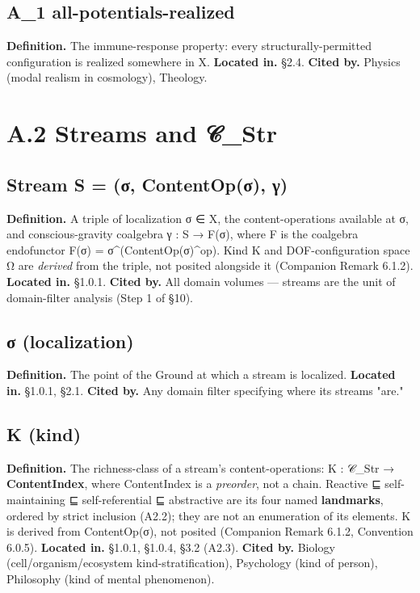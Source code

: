 \documentclass[11pt, openany]{book}
\newcommand{\sectionbreak}{\clearpage}
\begin{document}
\subsection{A\_\allowbreak{}1 all-potentials-realized}
\textbf{Definition.} The immune-response property: every structurally-permitted configuration is realized somewhere in X.
\textbf{Located in.} §2.4.
\textbf{Cited by.} Physics (modal realism in cosmology), Theology.

\sectionbreak

\section{A.2 Streams and 𝒞\_\allowbreak{}Str}

\subsection{Stream S = (σ, ContentOp(σ), γ)}
\textbf{Definition.} A triple of localization σ ∈ X, the content-operations available at σ, and conscious-gravity coalgebra γ : S → F(σ), where F is the coalgebra endofunctor F(σ) = σ\textasciicircum{}(ContentOp(σ)\textasciicircum{}op). Kind K and DOF-configuration space Ω are \textit{derived} from the triple, not posited alongside it (Companion Remark 6.1.2).
\textbf{Located in.} §1.0.1.
\textbf{Cited by.} All domain volumes --- streams are the unit of domain-filter analysis (Step 1 of §10).

\subsection{σ (localization)}
\textbf{Definition.} The point of the Ground at which a stream is localized.
\textbf{Located in.} §1.0.1, §2.1.
\textbf{Cited by.} Any domain filter specifying where its streams "are."

\subsection{K (kind)}
\textbf{Definition.} The richness-class of a stream's content-operations: K : 𝒞\_\allowbreak{}Str → \textbf{ContentIndex}, where ContentIndex is a \textit{preorder}, not a chain. Reactive ⊑ self-maintaining ⊑ self-referential ⊑ abstractive are its four named \textbf{landmarks}, ordered by strict inclusion (A2.2); they are not an enumeration of its elements. K is derived from ContentOp(σ), not posited (Companion Remark 6.1.2, Convention 6.0.5).
\textbf{Located in.} §1.0.1, §1.0.4, §3.2 (A2.3).
\textbf{Cited by.} Biology (cell/organism/ecosystem kind-stratification), Psychology (kind of person), Philosophy (kind of mental phenomenon).
\end{document}
